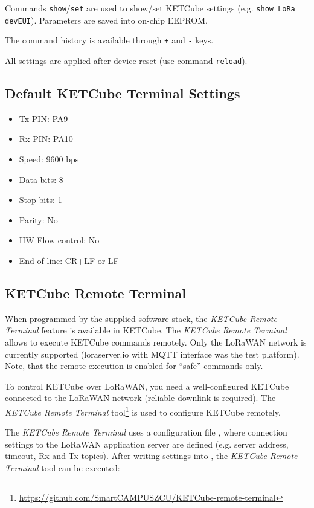 Commands {\tt show}/{\tt set} are used to show/set KETCube settings (e.g. {\tt show LoRa devEUI}). Parameters are saved into on-chip EEPROM.

The command history is available through {\tt +} and {\tt -} keys.

All settings are applied after device reset (use command {\tt reload}).


\clearpage 

\subsection{Default KETCube Terminal Settings}

\begin{itemize}
  \item Tx PIN: PA9
  \item Rx PIN: PA10
  \item Speed: 9600 bps
  \item Data bits: 8
  \item Stop bits: 1
  \item Parity: No
  \item HW Flow control: No
  \item End-of-line: CR+LF or LF
\end{itemize}

\subsection{KETCube Remote Terminal}
When programmed by the supplied software stack, the {\it KETCube Remote Terminal} feature is available in KETCube. The {\it KETCube Remote Terminal} allows to execute KETCube commands remotely. Only the LoRaWAN network is currently supported (loraserver.io with MQTT interface was the test platform). Note, that the remote execution is enabled for ``safe'' commands only.

To control KETCube over LoRaWAN, you need a well-configured KETCube connected to the LoRaWAN network (reliable downlink is required). The {\it KETCube Remote Terminal} tool\footnote{\url{https://github.com/SmartCAMPUSZCU/KETCube-remote-terminal}} is used to configure KETCube remotely.

The {\it KETCube Remote Terminal} uses a configuration file , where connection settings to the LoRaWAN application server are defined (e.g. server address, timeout, Rx and Tx topics). After writing settings into , the {\it KETCube Remote Terminal} tool can be executed:

